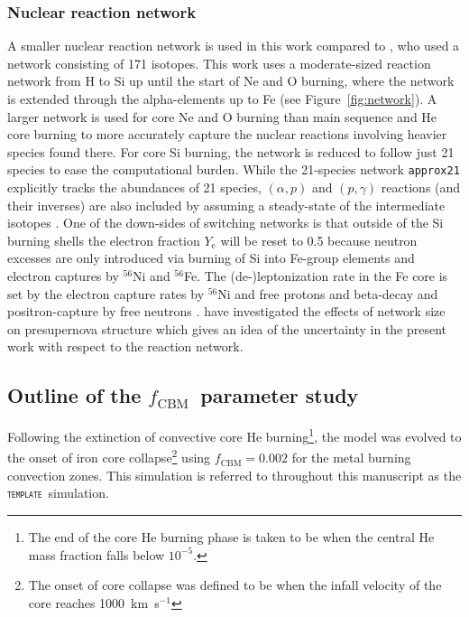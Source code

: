 \documentclass[useAMS,usenatbib]{mn2e}
\newcommand{\fcbm}{\ensuremath{f_\mathrm{CBM}}}
\newcommand{\template}{\textsc{\texttt{template}}}
\begin{document}
\subsubsection{Nuclear reaction network}

A smaller nuclear reaction network is used in this work compared to
\citet{Jones2015}, who used a network consisting of 171 isotopes. This work
uses a moderate-sized reaction network from H to Si up until the start of Ne 
and O burning, where the network is extended through the alpha-elements up to
Fe (see Figure~\ref{fig:network}). A larger network is used for core Ne and O
burning than main sequence and He core burning to more accurately capture the
nuclear reactions involving heavier species found there.  For core Si burning,
the network is reduced to follow just 21 species to ease the computational
burden. While the 21-species network \texttt{approx21} explicitly tracks the
abundances of 21 species, $(\alpha,p)$ and $(p,\gamma)$ reactions (and their
inverses) are also included by assuming a steady-state of the intermediate
isotopes \citep{weaver1978}. One of the down-sides of switching networks is
that outside of the Si burning shells the electron fraction $Y_\mathrm{e}$ will
be reset to 0.5 because neutron excesses are only introduced via burning of Si
into Fe-group elements and electron captures by $^{56}$Ni and $^{56}$Fe. The
(de-)leptonization rate in the Fe core is set by the electron capture rates by
$^{56}$Ni and free protons and beta-decay and positron-capture by free neutrons
\citep[using reaction rates from][]{Langanke2000}. \citet{Farmer2016} have
investigated the effects of network size on presupernova structure which gives 
an idea of the uncertainty in the present work with respect to the reaction network. 

\subsection{Outline of the \fcbm~parameter study}\label{sec: methods-fcbm}

Following the extinction of convective core He burning\footnote{The end of the
core He burning phase is taken to be when the central He mass fraction falls
below $10^{-5}$.}, the model was evolved to the onset of iron core
collapse\footnote{The onset of core collapse was defined to be when the infall
velocity of the core reaches 1000~km~s$^{-1}$} using $\fcbm=0.002$ for the metal burning convection zones. This simulation is referred to throughout this manuscript as the \template\ simulation.
\end{document}
